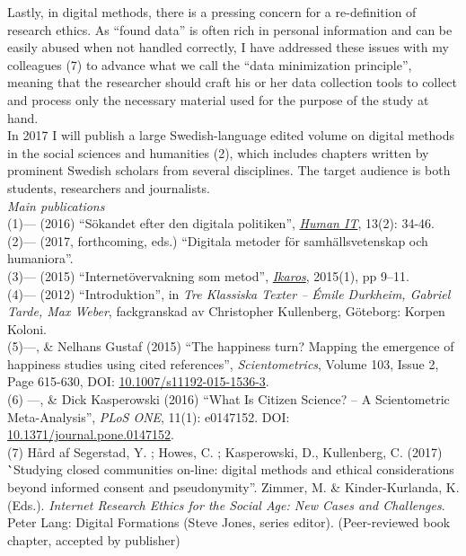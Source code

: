 \documentclass[a4paper,11pt,oneside]{article}
\begin{document}
     Lastly, in digital methods, there is a pressing concern for a re-definition
     of research ethics. As ``found data'' is often rich in personal information
     and can be easily abused when not handled correctly, I have addressed these
     issues with my colleagues (7) to advance what we call the ``data minimization principle'',
     meaning that the researcher should craft his or her data collection tools
     to collect and process only the necessary material used for the purpose of
     the study at hand.\\

     In 2017 I will publish a large Swedish-language edited volume on digital methods in the social
     sciences and humanities (2), which includes chapters written by prominent Swedish
     scholars from several disciplines. The target audience is both students,
     researchers and journalists.\\

      \noindent  \emph{Main publications} \\
      (1)--- (2016) ``Sökandet efter den digitala politiken'', \href{https://humanit.hb.se/article/view/504/572}{\emph{Human IT}}, 13(2): 34-46.\\
      (2)--- (2017, forthcoming, eds.) ``Digitala metoder för samhällsvetenskap och humaniora''.\\
      (3)--- (2015) ``Internetövervakning som metod'', \href{http://gup.ub.gu.se/records/fulltext/220443/220443.pdf}{\emph{Ikaros}}, 2015(1), pp 9–11.\\
      (4)--- (2012) ``Introduktion'', in \emph{Tre Klassiska Texter – Émile Durkheim, Gabriel Tarde, Max Weber}, fackgranskad av Christopher Kullenberg, Göteborg: Korpen Koloni.\\
      (5)---, \& Nelhans Gustaf (2015) ``The happiness turn? Mapping the emergence of happiness studies using cited references'', \emph{Scientometrics}, Volume 103, Issue 2, Page 615-630, DOI: \href{http://dx.doi.org/10.1007/s11192-015-1536-3}{10.1007/s11192-015-1536-3}.\\
      (6) ---, \& Dick Kasperowski (2016) ``What Is Citizen Science? – A Scientometric Meta-Analysis'', \emph{PLoS ONE}, 11(1): e0147152. DOI: \href{http://dx.doi.org/10.1371/journal.pone.0147152}{10.1371/journal.pone.0147152}.\\
      (7) Hård af Segerstad, Y. ; Howes, C. ; Kasperowski, D., Kullenberg, C. (2017) \``Studying closed communities on-line: digital methods and ethical considerations beyond informed consent and pseudonymity''. Zimmer, M. & Kinder-Kurlanda, K. (Eds.). \emph{Internet Research Ethics for the Social Age: New Cases and Challenges}. Peter Lang: Digital Formations (Steve Jones, series editor). (Peer-reviewed book chapter, accepted by publisher) \\
\end{document}

